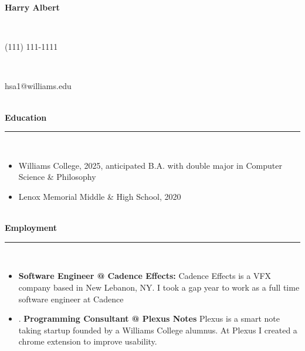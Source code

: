 \documentclass[10pt]{extarticle}
\begin{document}
\thispagestyle{empty}
\vspace{-\baselineskip}
\begin{center}
\Large \textbf{Harry Albert}
\end{center}
\vspace{-6.5ex}~\\ 
\vspace{-\baselineskip}
\begin{center}
\normalsize (111) 111-1111
\end{center}
\vspace{-6ex}~\\ 
\vspace{-\baselineskip}
\begin{center}
\normalsize hsa1@williams.edu
\end{center}
\vspace{-6ex}~\\ 
\textbf{Education}\\[-2ex]
\rule{\textwidth}{0.4pt}\\ 
\vspace{-\baselineskip}
\begin{itemize}[noitemsep,nolistsep]
\item Williams College, 2025, anticipated B.A. with double major in Computer Science \& Philosophy
\item Lenox Memorial Middle \& High School, 2020
\end{itemize}~\\[-1ex]
\textbf{Employment}\\[-2ex]
\rule{\textwidth}{0.4pt}\\ 
\vspace{-\baselineskip}
\begin{itemize}[noitemsep,nolistsep]
\item \textbf{Software Engineer @ Cadence Effects: } Cadence Effects is a VFX company based in New Lebanon, NY. I took a gap year to work as a full time software engineer at Cadence
\item . \textbf{Programming Consultant @ Plexus Notes} Plexus is a smart note taking startup founded by a Williams College alumnus. At Plexus I created a chrome extension to improve usability.
\end{itemize}
\end{document}
